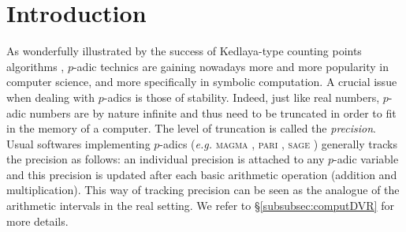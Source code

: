 \documentclass{article}
\begin{document}
\section{Introduction}

As wonderfully illustrated by the success of Kedlaya-type counting 
points algorithms \cite{kedlaya}, $p$-adic technics are gaining nowadays 
more and more popularity in computer science, and more specifically in 
symbolic computation. A crucial issue when dealing with $p$-adics is 
those of stability. Indeed, just like real numbers, $p$-adic numbers are 
by nature infinite and thus need to be truncated in order to fit in the 
memory of a computer. The level of truncation is called the 
\emph{precision}. Usual softwares implementing $p$-adics (\emph{e.g.} 
\textsc{magma} \cite{magma}, \textsc{pari} \cite{pari}, \textsc{sage} 
\cite{sage}) generally tracks the precision as follows: an individual 
precision is attached to any $p$-adic variable and this precision is 
updated after each basic arithmetic operation (addition and 
multiplication). This way of tracking precision can be seen as the 
analogue of the arithmetic intervals in the real setting. We refer
to \S \ref{subsubsec:computDVR} for more details.
\end{document}
